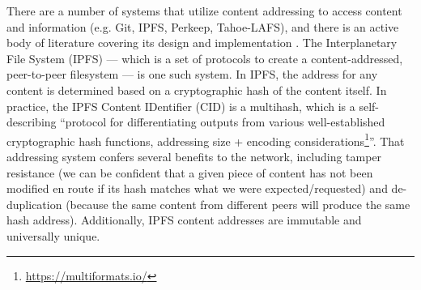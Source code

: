 \documentclass{textile}
\begin{document}
There are a number of systems that utilize content addressing to access content and information (e.g. Git, IPFS, Perkeep, Tahoe-LAFS), and there is an active body of literature covering its design and implementation \cite{benetIPFSContentAddressed2014,selimi_tahoeLafs_2014,rhea_fast_2008}. The Interplanetary File System (IPFS) --- which is a set of protocols to create a content-addressed, peer-to-peer filesystem \cite{benetIPFSContentAddressed2014} --- is one such system. In IPFS, the address for any content is determined based on a cryptographic hash of the content itself. In practice, the IPFS Content IDentifier (CID) is a multihash, which is a self-describing ``protocol for differentiating outputs from various well-established cryptographic hash functions, addressing size + encoding considerations\footnote{\url{https://multiformats.io/}}''. That addressing system confers several benefits to the network, including tamper resistance (we can be confident that a given piece of content has not been modified en route if its hash matches what we were expected/requested) and de-duplication (because the same content from different peers will produce the same hash address). Additionally, IPFS content addresses are immutable and universally unique.
\end{document}
